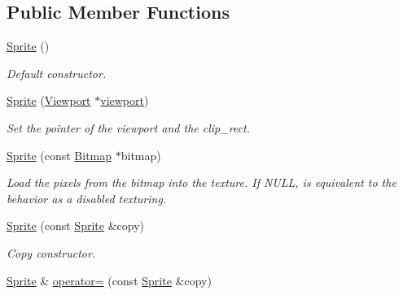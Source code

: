 \subsection*{Public Member Functions}
\begin{DoxyCompactItemize}
\item 
\hypertarget{class_f2_c_1_1_sprite_adfbb0aa21734d8e4e24b50dffe00ada4}{
\hyperlink{class_f2_c_1_1_sprite_adfbb0aa21734d8e4e24b50dffe00ada4}{Sprite} ()}
\label{class_f2_c_1_1_sprite_adfbb0aa21734d8e4e24b50dffe00ada4}

\begin{DoxyCompactList}\small\item\em Default constructor. \item\end{DoxyCompactList}\item 
\hyperlink{class_f2_c_1_1_sprite_a858b8f2c06e804c19f6c6a5cbe760c1b}{Sprite} (\hyperlink{class_f2_c_1_1_viewport}{Viewport} $\ast$\hyperlink{class_f2_c_1_1_sprite_a66cc8d6922dcbf4331b360800ba47177}{viewport})
\begin{DoxyCompactList}\small\item\em Set the pointer of the viewport and the clip\_\-rect. \item\end{DoxyCompactList}\item 
\hyperlink{class_f2_c_1_1_sprite_a18cd93c504d29dfc9df20dcde1968c45}{Sprite} (const \hyperlink{class_f2_c_1_1_bitmap}{Bitmap} $\ast$bitmap)
\begin{DoxyCompactList}\small\item\em Load the pixels from the bitmap into the texture. If NULL, is equivalent to the behavior as a disabled texturing. \item\end{DoxyCompactList}\item 
\hypertarget{class_f2_c_1_1_sprite_a7efb0dbc78a120afa45db3b2e4c69e58}{
\hyperlink{class_f2_c_1_1_sprite_a7efb0dbc78a120afa45db3b2e4c69e58}{Sprite} (const \hyperlink{class_f2_c_1_1_sprite}{Sprite} \&copy)}
\label{class_f2_c_1_1_sprite_a7efb0dbc78a120afa45db3b2e4c69e58}

\begin{DoxyCompactList}\small\item\em Copy constructor. \item\end{DoxyCompactList}\item 
\hypertarget{class_f2_c_1_1_sprite_a8bcf707d839630b917e9479bc2380c16}{
\hyperlink{class_f2_c_1_1_sprite}{Sprite} \& \hyperlink{class_f2_c_1_1_sprite_a8bcf707d839630b917e9479bc2380c16}{operator=} (const \hyperlink{class_f2_c_1_1_sprite}{Sprite} \&copy)}
\label{class_f2_c_1_1_sprite_a8bcf707d839630b917e9479bc2380c16}


\end{DoxyCompactItemize}
